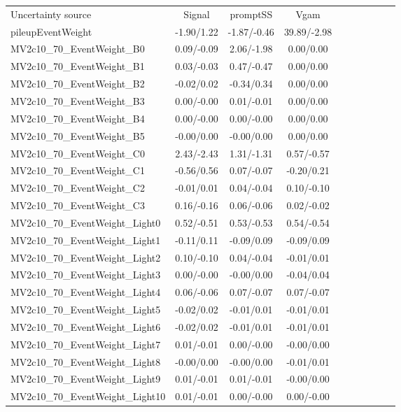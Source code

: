 \begin{table}[h]
\scriptsize
\begin{center}
\begin{tabular}{l|ccccccccc}
\hline
\hline
Uncertainty source &Signal &promptSS &Vgam \\
pileupEventWeight &-1.90/1.22 &-1.87/-0.46 &39.89/-2.98 \\
MV2c10\_70\_EventWeight\_B0 &0.09/-0.09 &2.06/-1.98 &0.00/0.00 \\
MV2c10\_70\_EventWeight\_B1 &0.03/-0.03 &0.47/-0.47 &0.00/0.00 \\
MV2c10\_70\_EventWeight\_B2 &-0.02/0.02 &-0.34/0.34 &0.00/0.00 \\
MV2c10\_70\_EventWeight\_B3 &0.00/-0.00 &0.01/-0.01 &0.00/0.00 \\
MV2c10\_70\_EventWeight\_B4 &0.00/-0.00 &0.00/-0.00 &0.00/0.00 \\
MV2c10\_70\_EventWeight\_B5 &-0.00/0.00 &-0.00/0.00 &0.00/0.00 \\
MV2c10\_70\_EventWeight\_C0 &2.43/-2.43 &1.31/-1.31 &0.57/-0.57 \\
MV2c10\_70\_EventWeight\_C1 &-0.56/0.56 &0.07/-0.07 &-0.20/0.21 \\
MV2c10\_70\_EventWeight\_C2 &-0.01/0.01 &0.04/-0.04 &0.10/-0.10 \\
MV2c10\_70\_EventWeight\_C3 &0.16/-0.16 &0.06/-0.06 &0.02/-0.02 \\
MV2c10\_70\_EventWeight\_Light0 &0.52/-0.51 &0.53/-0.53 &0.54/-0.54 \\
MV2c10\_70\_EventWeight\_Light1 &-0.11/0.11 &-0.09/0.09 &-0.09/0.09 \\
MV2c10\_70\_EventWeight\_Light2 &0.10/-0.10 &0.04/-0.04 &-0.01/0.01 \\
MV2c10\_70\_EventWeight\_Light3 &0.00/-0.00 &-0.00/0.00 &-0.04/0.04 \\
MV2c10\_70\_EventWeight\_Light4 &0.06/-0.06 &0.07/-0.07 &0.07/-0.07 \\
MV2c10\_70\_EventWeight\_Light5 &-0.02/0.02 &-0.01/0.01 &-0.01/0.01 \\
MV2c10\_70\_EventWeight\_Light6 &-0.02/0.02 &-0.01/0.01 &-0.01/0.01 \\
MV2c10\_70\_EventWeight\_Light7 &0.01/-0.01 &0.00/-0.00 &-0.00/0.00 \\
MV2c10\_70\_EventWeight\_Light8 &-0.00/0.00 &-0.00/0.00 &-0.01/0.01 \\
MV2c10\_70\_EventWeight\_Light9 &0.01/-0.01 &0.01/-0.01 &-0.00/0.00 \\
MV2c10\_70\_EventWeight\_Light10 &0.01/-0.01 &0.00/-0.00 &0.00/-0.00 \\

\end{tabular}
\end{center}
\end{table}
